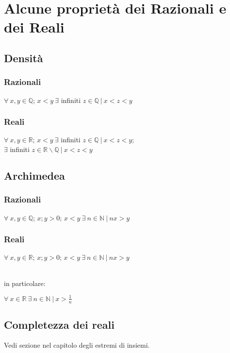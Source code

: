 \chapter{Alcune proprietà dei Razionali e dei Reali}
\section{Densità}
\subsection{Razionali}
\begin{Large}
$\forall\ x,y \in \mathbb{Q}$; $x<y\ \exists$ infiniti $z \in \mathbb{Q}\ |\ x<z<y$
\end{Large}
\subsection{Reali}
\begin{Large}
$\forall\ x,y \in \mathbb{R}$; $x<y\ \exists$ infiniti $z \in \mathbb{Q}\ |\ x<z<y$;\\
$\exists$ infiniti $z \in \mathbb{R} \backslash \mathbb{Q}\ |\ x<z<y$
\end{Large}

\section{Archimedea}
\subsection{Razionali}
\begin{Large}
$\forall\ x,y \in \mathbb{Q}$; $x;y > 0$; $x<y\ \exists\ n \in \mathbb{N}\ |\ nx>y$
\end{Large}
\subsection{Reali}
\begin{Large}
$\forall\ x,y \in \mathbb{R}$; $x;y > 0$; $x<y\ \exists\ n \in \mathbb{N}\ |\ nx>y$
\end{Large}\\
in particolare:\\
\begin{Large}
$\forall\ x \in \mathbb{R}\ \exists\ n \in \mathbb{N}\ |\ x>\frac{1}{n}$
\end{Large}

\section{Completezza dei reali}
Vedi sezione nel capitolo degli estremi di insiemi.
